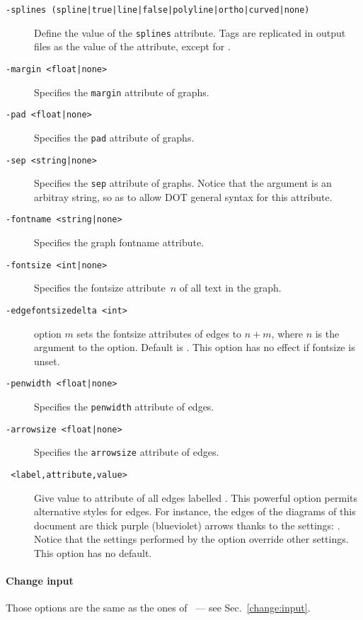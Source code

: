 \begin{description}
\item[{\tt -splines (spline|true|line|false|polyline|ortho|curved|none)}]
Define the value of the \texttt{splines} attribute. Tags are replicated in
output files as the value of the attribute, except for .
\item[{\tt -margin <float|none>}] Specifies the \texttt{margin} attribute of graphs.
\item[{\tt -pad <float|none>}] Specifies the \texttt{pad} attribute of graphs.
\item[{\tt -sep <string|none>}] Specifies the \texttt{sep} attribute of graphs.
Notice that the argument is an arbitray string, so as to allow DOT general
syntax for this attribute.
\item[{\tt -fontname <string|none>}] Specifies the graph fontname attribute.
\item[{\tt -fontsize <int|none>}] Specifies the fontsize attribute~$n$ of all
text in the graph.
\item[{\tt -edgefontsizedelta <int>}] option $m$ sets
the fontsize attributes of edges to $n+m$, where $n$ is the argument to
the  option. Default is . This option has  no effect if
fontsize is unset.
\item[{\tt -penwidth <float|none>}] Specifies the \texttt{penwidth} attribute of
edges.
\item[{\tt -arrowsize <float|none>}] Specifies the \texttt{arrowsize}
attribute of edges.
\item[{\tt {} <label,attribute,value>}]
Give value  to attribute   of all edges labelled
. This powerful option  permits alternative styles for edges.
For instance, the  edges of the diagrams of this document
are thick purple (blueviolet) arrows thanks to the settings:
. Notice that the settings performed
by the  option override other settings.
This option has no default.
\end{description}

\paragraph*{Change input}
Those options are the same as the ones
of~\litmus{} --- see Sec.~\ref{change:input}.

